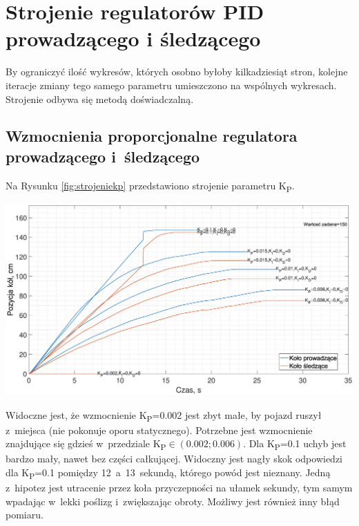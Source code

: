\section{Strojenie regulatorów PID prowadzącego i śledzącego}
By ograniczyć ilość wykresów, których osobno byłoby kilkadziesiąt stron, kolejne iteracje zmiany tego samego parametru umieszczono na wspólnych wykresach. Strojenie odbywa się metodą doświadczalną.
\vspace*{-0.5cm}

\subsection*{Wzmocnienia proporcjonalne regulatora prowadzącego i~śledzącego}
Na Rysunku \ref{fig:strojeniekp} przedstawiono strojenie parametru K\textsubscript{P}.
\vspace*{-1cm}

\begin{center}
    \includegraphics[scale=0.32]{images/strojenieKp.eps}
    \label{fig:strojeniekp}
\end{center}

Widoczne jest, że wzmocnienie K\textsubscript{P}=0.002 jest zbyt małe, by pojazd ruszył z~miejsca (nie pokonuje oporu statycznego). Potrzebne jest wzmocnienie znajdujące się gdzieś w~przedziale K\textsubscript{P}$\in \left(0.002;0.006\right)$. Dla K\textsubscript{P}=0.1 uchyb jest bardzo mały, nawet bez części całkującej. Widoczny jest nagły skok odpowiedzi dla K\textsubscript{P}=0.1 pomiędzy 12~a~13~sekundą, którego powód jest nieznany. Jedną z~hipotez jest utracenie przez koła przyczepności na ułamek sekundy, tym samym wpadając w~lekki poślizg i~zwiększając obroty. Możliwy jest również inny błąd pomiaru.

